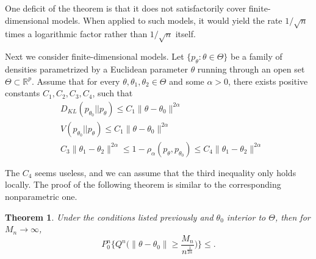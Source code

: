 \documentclass[11pt, letterpaper]{article}
\theoremstyle{plain}
\newtheorem{theorem}{\quad\quad Theorem}
\theoremstyle{definition}
\theoremstyle{remark}
\begin{document}
One deficit of the theorem is that it does not satisfactorily cover finite-dimensional models.
When applied to such models, it would yield the rate $1/\sqrt{n}$ times a logarithmic factor rather than $1/\sqrt{n}$ itself.

Next we consider finite-dimensional models.
Let $\{p_{\theta}: \theta\in \Theta\}$ be a family of densities parametrized by a Euclidean parameter $\theta$ running through an open set $\Theta\subset \mathbb{R}^p$. 
Assume that for every $\theta, \theta_1,\theta_2 \in \Theta$ and some $\alpha>0$,
there exists positive constants $C_1,C_2,C_3,C_4$, such that
$$
\begin{aligned}
    &D_{KL}(p_{\theta_0} || p_{\theta})\leq C_1 \|\theta-\theta_0\|^{2\alpha}\\
    &V(p_{\theta_0} || p_{\theta})\leq C_1 \|\theta-\theta_0\|^{2\alpha}\\
    &C_3 \|\theta_1-\theta_2\|^{2\alpha}\leq 1-\rho_{\alpha}(p_{\theta} , p_{\theta_0})\leq C_4 \|\theta_1-\theta_2\|^{2\alpha}\\
    &\\
\end{aligned}
$$
The $C_4$ seems useless, and we can assume that the third inequality only holds locally.
The proof of the following theorem is similar to the corresponding nonparametric one.
\begin{theorem}
    Under the conditions listed previously and $\theta_0$ interior to $\Theta$, then for $M_n\to \infty$,
    $$
    P_0^n \Big\{ Q^n \big( \|\theta-\theta_0\|\geq \frac{M_n}{n^{\frac{1}{2\alpha}}}\big)\Big\}
    \leq
    .
    $$
\end{theorem}
\end{document}
